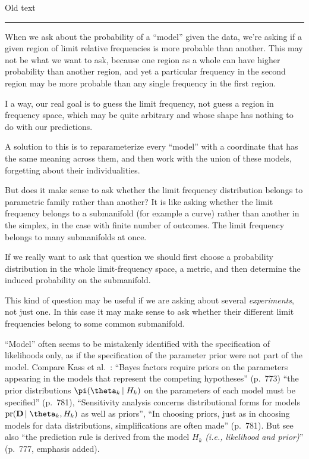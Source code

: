 \documentclass[\ifafour a4paper,12pt,\else a5paper,10pt,\fi%
onecolumn,oneside,article,%
british%
]{memoir}
\theoremstyle{remark}
\theoremstyle{innote}
\newcommand*{\citey}{\parencites*}
\renewcommand*{\|}{\nonscript\,\vert\nonscript\;\mathopen{}}
\newcommand*{\etal}{{et al.}}
\begin{document}
\clearpage
Old text\\
\hrule

When we ask about the probability of a \enquote{model} given the data,
we're asking if a given region of limit relative frequencies is more
probable than another. This may not be what we want to ask, because one
region as a whole can have higher probability than another region, and yet
a particular frequency in the second region may be more probable than any single
frequency in the first region.

I a way, our real goal is to guess the limit frequency, not guess a region
in frequency space, which may be quite arbitrary and whose shape has
nothing to do with our predictions.

A solution to this is to reparameterize every \enquote{model} with a
coordinate that has the same meaning across them, and then work with the
union of these models, forgetting about their individualities.


But does it make sense to ask whether the limit frequency distribution
belongs to parametric family rather than another? It is like asking whether
the limit frequency belongs to a submanifold (for example a curve) rather
than another in the simplex, in the case with finite number of outcomes.
The limit frequency belongs to many submanifolds at once.

If we really want to ask that question we should first choose a probability
distribution in the whole limit-frequency space, a metric, and then
determine the induced probability on the submanifold.

This kind of question may be useful if we are asking about several
\emph{experiments}, not just one. In this case it may make sense to ask
whether their different limit frequencies belong to some common submanifold.



\enquote{Model} often seems to be mistakenly identified with the
specification of likelihoods only, as if the specification of the parameter
prior were not part of the model. Compare Kass \etal\ \citey{kassetal1995}:
\enquote{Bayes factors require priors on the parameters appearing in the
  models that represent the competing hypotheses} (p.~773) \enquote{the
  prior distributions $\pi(\theta_k \| H_k)$ on the parameters of each
  model must be specified} (p.~781), \enquote{Sensitivity analysis concerns
  distributional forms for models
  $\mathrm{pr}(\mathbf{D} \| \theta_k, H_k)$ as well as priors},
\enquote{In choosing priors, just as in choosing models for data
  distributions, simplifications are often made} (p.~781). But see also
\enquote{the prediction rule is derived from the model $H_k$ \emph{(i.e.,
    likelihood and prior)}} (p.~777, emphasis added).
\end{document}
